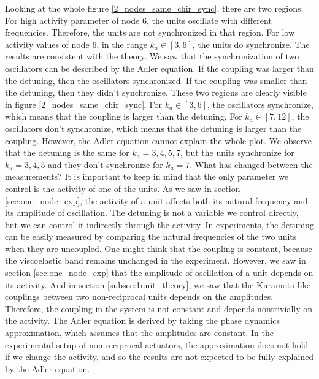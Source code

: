 \documentclass[11pt, a4paper]{article} %
\begin{document}
Looking at the whole figure \ref{2_nodes_same_chir_sync}, there are two regions. For high activity parameter of node 6, 
the units oscillate with different frequencies. Therefore, the units are not synchronized in that region. 
For low activity values of node 6, in the range $k_a \in [3,6]$, the units do synchronize. The results are 
consistent with the theory. We saw that the synchronization of two oscillators can be described by the Adler equation.
If the coupling was larger than the detuning, then the oscillators synchronized. If the coupling 
was smaller than the detuning, then they didn't synchronize. These two regions are clearly visible in figure \ref{2_nodes_same_chir_sync}.
For $k_a \in [3,6]$, the oscillators synchronize, which means that the coupling is larger than the detuning. 
For $k_a \in [7,12]$, the oscillators don't synchronize, which means that the detuning is larger than the coupling.
However, the Adler equation cannot explain the whole plot. We observe that the detuning is the same for $k_a = 3,4,5,7$, 
but the units synchronize for $k_a = 3,4,5$ and they don't synchronize for $k_a = 7$. What has changed between the measurements? 
It is important to keep in mind that the only parameter we control is the activity of one of the units. As we saw in section 
\ref{sec:one_node_exp}, the activity of a unit affects both its natural frequency and its amplitude of oscillation. 
The detuning is not a variable we control directly, but we can control it indirectly through the activity. 
In experiments, the detuning can be easily measured by comparing the natural frequencies of the two units when they are uncoupled.
One might think that the coupling is constant, because the viscoelastic band remains unchanged in the experiment. 
However, we saw in section \ref{sec:one_node_exp} that the amplitude of oscillation of a unit depends on its activity.
And in section \ref{subsec:1unit_theory}, we saw that the Kuramoto-like couplings between two non-reciprocal units depends 
on the amplitudes. Therefore, the coupling in the system is not constant and depends nontrivially on the activity. 
The Adler equation is derived by taking the phase dynamics approximation, which assumes that the amplitudes are constant. 
In the experimental setup of non-reciprocal actuators, the approximation does not hold if we change the activity, 
and so the results are not expected to be fully explained by the Adler equation. 
\end{document}
